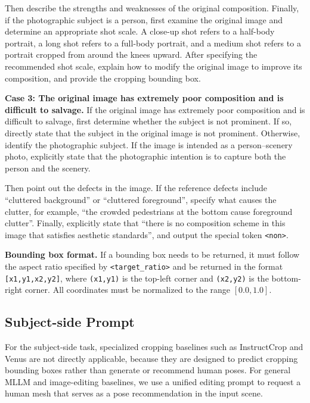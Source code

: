 \documentclass{llmxive}
\begin{document}
\begin{promptbox}
Then describe the strengths and weaknesses of the original composition. Finally, if the photographic subject is a person, first examine the original image and determine an appropriate shot scale. A close-up shot refers to a half-body portrait, a long shot refers to a full-body portrait, and a medium shot refers to a portrait cropped from around the knees upward. After specifying the recommended shot scale, explain how to modify the original image to improve its composition, and provide the cropping bounding box.

\vspace{0.5em}
\noindent\textbf{Case 3: The original image has extremely poor composition and is difficult to salvage.}
If the original image has extremely poor composition and is difficult to salvage, first determine whether the subject is not prominent. If so, directly state that the subject in the original image is not prominent. Otherwise, identify the photographic subject. If the image is intended as a person--scenery photo, explicitly state that the photographic intention is to capture both the person and the scenery.

Then point out the defects in the image. If the reference defects include ``cluttered background'' or ``cluttered foreground'', specify what causes the clutter, for example, ``the crowded pedestrians at the bottom cause foreground clutter''. Finally, explicitly state that ``there is no composition scheme in this image that satisfies aesthetic standards'', and output the special token \texttt{<non>}.

\vspace{0.5em}
\noindent\textbf{Bounding box format.}
If a bounding box needs to be returned, it must follow the aspect ratio specified by \texttt{<target\_ratio>} and be returned in the format \texttt{[x1,y1,x2,y2]}, where \texttt{(x1,y1)} is the top-left corner and \texttt{(x2,y2)} is the bottom-right corner. All coordinates must be normalized to the range \([0.0, 1.0]\).

\end{promptbox}


\subsection{Subject-side Prompt}
\label{app:subject_side_baseline_prompt}

For the subject-side task, specialized cropping baselines such as InstructCrop and Venus are not directly applicable, because they are designed to predict cropping bounding boxes rather than generate or recommend human poses. For general MLLM and image-editing baselines, we use a unified editing prompt to request a human mesh that serves as a pose recommendation in the input scene.
\end{document}
